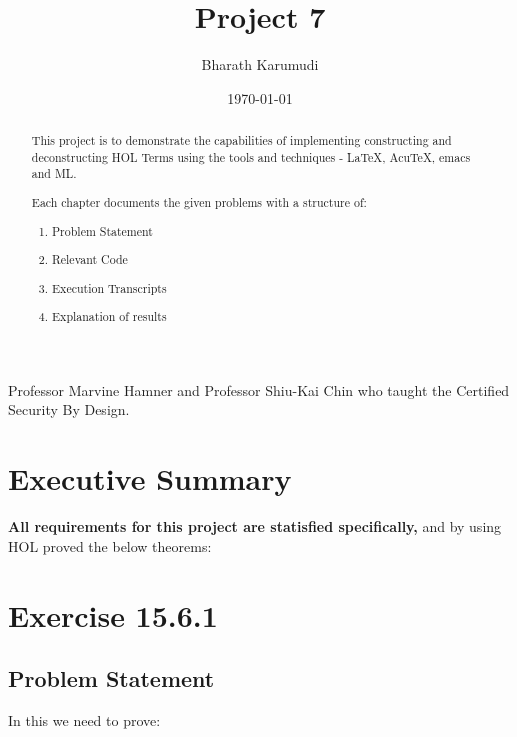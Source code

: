 \documentclass{report}
\title{Project 7}
\author{Bharath Karumudi}
\date{\today}
\begin{document}
 \lstset{language=ML}
 \maketitle{}

 \begin{abstract}
   This project is to demonstrate the capabilities of implementing
   constructing and deconstructing HOL Terms using the tools and
   techniques - \LaTeX{}, AcuTeX, emacs and ML. 

   Each chapter documents the given problems with a structure of:
   \begin{enumerate}
   \item Problem Statement
   \item Relevant Code
   \item Execution Transcripts
   \item Explanation of results
   \end{enumerate}

 \end{abstract}


 \begin{acknowledgments}
  Professor Marvine Hamner and Professor Shiu-Kai Chin who taught the
  Certified Security By Design.
 \end{acknowledgments}

 \tableofcontents{}

 \chapter{Executive Summary}
 \label{cha:executive-summary}

\textbf{All requirements for this project are statisfied specifically,}
 and by using HOL proved the below theorems:
\begin{quote}



\end{quote}



 \chapter{Exercise 15.6.1}
 \label{cha:exercise-15.6.1}
  
 \section{Problem Statement}
 \label{sec:problem-statement-1}
In this we need to prove:  
\end{document}
